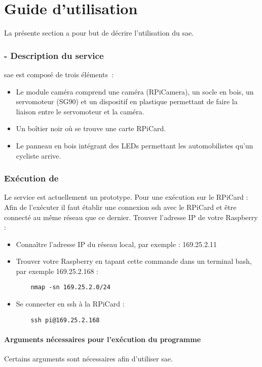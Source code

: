 \part{Guide d'utilisation}
La présente section a pour but de décrire l'utilisation du \gls{sae}.

\section{ - Description du service}
\label{sec:description_clearWay}

\gls{sae} est composé de trois éléments :
\begin{itemize}
    \item Le module caméra comprend une caméra (\gls{RPiCamera}), un socle en bois, un servomoteur (\gls{SG90})  
    et un dispositif en plastique permettant de faire la liaison entre le servomoteur et la caméra.
    \item Un boîtier noir où se trouve une carte \gls{RPiCard}.
    \item Le panneau en bois intégrant des LEDs permettant les automobilistes qu'un cycliste arrive.
\end{itemize}

\section{Exécution de }
\label{sec:execution_clearWay}

Le service est actuellement un prototype. Pour une exécution sur le \gls{RPiCard} :
Afin de l'exécuter il faut établir une connexion ssh avec le \gls{RPiCard} et être connecté au même réseau que ce dernier.
Trouver l'adresse IP de votre Raspberry :
\begin{itemize}
    \item Connaître l'adresse IP du réseau local, par exemple : 169.25.2.11
    \item Trouver votre Raspberry en tapant cette commande dans un terminal bash, par exemple 169.25.2.168 : 
\begin{verbatim}
    nmap -sn 169.25.2.0/24
\end{verbatim}
    \item Se connecter en ssh à la \gls{RPiCard} :
\begin{verbatim}
    ssh pi@169.25.2.168
\end{verbatim}
\end{itemize}

\subsection{Arguments nécessaires pour l'exécution du programme}
\label{sec:executionArg_clearWay}
Certains arguments sont nécessaires afin d'utiliser \gls{sae}.
